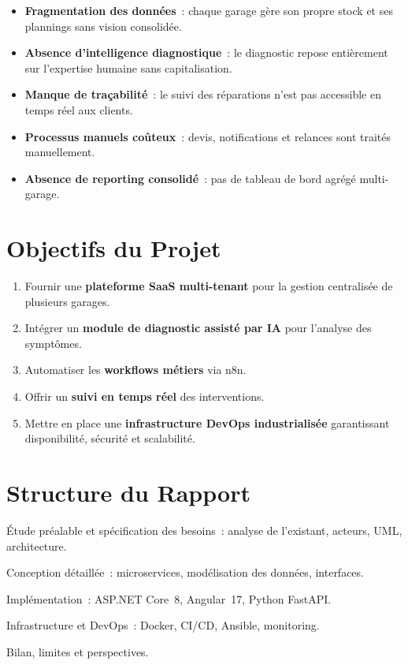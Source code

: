 \documentclass[12pt,a4paper]{report}
\begin{document}
\begin{itemize}[leftmargin=1.5cm]
  \item \textbf{Fragmentation des donn\'{e}es}~: chaque garage g\`{e}re
    son propre stock et ses plannings sans vision consolid\'{e}e.
  \item \textbf{Absence d'intelligence diagnostique}~: le diagnostic repose
    enti\`{e}rement sur l'expertise humaine sans capitalisation.
  \item \textbf{Manque de tra\c{c}abilit\'{e}}~: le suivi des r\'{e}parations
    n'est pas accessible en temps r\'{e}el aux clients.
  \item \textbf{Processus manuels co\^{u}teux}~: devis, notifications et
    relances sont trait\'{e}s manuellement.
  \item \textbf{Absence de reporting consolid\'{e}}~: pas de tableau de bord
    agr\'{e}g\'{e} multi-garage.
\end{itemize}

\section*{Objectifs du Projet}

\begin{enumerate}[leftmargin=1.5cm]
  \item Fournir une \textbf{plateforme SaaS multi-tenant} pour la gestion
    centralis\'{e}e de plusieurs garages.
  \item Int\'{e}grer un \textbf{module de diagnostic assist\'{e} par IA}
    pour l'analyse des sympt\^{o}mes.
  \item Automatiser les \textbf{workflows m\'{e}tiers} via n8n.
  \item Offrir un \textbf{suivi en temps r\'{e}el} des interventions.
  \item Mettre en place une \textbf{infrastructure DevOps industrialis\'{e}e}
    garantissant disponibilit\'{e}, s\'{e}curit\'{e} et scalabilit\'{e}.
\end{enumerate}

\section*{Structure du Rapport}

\begin{description}[leftmargin=2cm]
  \item[\textbf{Chapitre~1}] \'{E}tude pr\'{e}alable et sp\'{e}cification
    des besoins~: analyse de l'existant, acteurs, UML, architecture.
  \item[\textbf{Chapitre~2}] Conception d\'{e}taill\'{e}e~: microservices,
    mod\'{e}lisation des donn\'{e}es, interfaces.
  \item[\textbf{Chapitre~3}] Impl\'{e}mentation~: ASP.NET Core~8,
    Angular~17, Python FastAPI.
  \item[\textbf{Chapitre~4}] Infrastructure et DevOps~: Docker, CI/CD,
    Ansible, monitoring.
  \item[\textbf{Conclusion}] Bilan, limites et perspectives.
\end{description}
\end{document}
